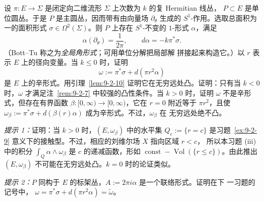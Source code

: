 \begin{exercise}\label{ex:9-2-14}
设 $\pi:E\to\Sigma$ 是闭定向二维流形 $\Sigma$ 上次数为 $k$ 的复 Hermitian 线丛，
$P\subset E$ 是单位圆丛。于是 $P$ 是主圆丛，因而带有由向量场 $\partial_\theta$ 生成的
$S^1$-作用。选取总面积为一的面积形式 $\sigma\in\Omega^2(\Sigma)$。则 $P$ 上存在
$S^1$-不变的 $1$-形式 $\alpha$，满足
\[
  \alpha(\partial_\theta)=\frac1{2\pi},
  \qquad d\alpha=-k\pi^*\sigma.
\]
（Bott--Tu  称之为\emph{全局角形式}；可用单位分解把局部解
拼接起来构造它。）以 $r$ 表示 $E$ 上的径向变量。当 $k\le0$ 时，证明
\[
  \omega:=\pi^*\sigma+d(\pi r^2\alpha)
\]
是 $E$ 上的辛形式。用引理~\ref{lem:9-2-10} 证明它在无穷远处凸。证明：只有当 $k<0$
时，$\omega$ 才满足注~\ref{rem:9-2-7} 中较强的凸性条件。当 $k>0$ 时，证明 $\omega$
不是辛形式，但存在有界函数 $\beta:[0,\infty)\to[0,\infty)$，它在 $r=0$ 附近等于
$\pi r^2$，且使
$\omega_\beta:=\pi^*\sigma+d(\beta(r)\alpha)$ 成为辛形式。不过，$\omega_\beta$ 在
无穷远处绝不凸。

\emph{提示 1：}证明：当 $k>0$ 时，$(E,\omega_\beta)$ 中的水平集
$Q_c:=\{r=c\}$ 是习题~\ref{ex:9-2-9} 意义下的接触型。不过，相应的刘维尔场
$X$ 指向区域 $r<c$，
所以本习题 (iii) 中的积分
$\int_Q\alpha\wedge\omega_\beta$ 是 $c$ 的递减函数，形如
$\operatorname{const}-\operatorname{Vol}(\{r\le c\})$。由此推出
$(E,\omega_\beta)$ 不可能在无穷远处凸。$k=0$ 时的论证类似。

\emph{提示 2：}$P$ 同构于 $E$ 的标架丛，$A:=2\pi i\alpha$ 是一个联络形式。证明在下
一习题的记号中，
$\omega=\pi^*\sigma+d(\pi r^2\alpha)=\widetilde\omega$。
\end{exercise}

